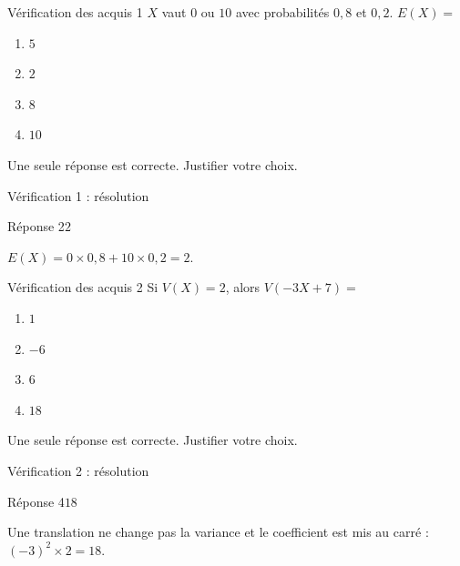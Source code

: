 \documentclass[aspectratio=169,12pt]{beamer}
\begin{document}
\renewcommand{\slidekind}{À VOUS DE JOUER}\begin{frame}[t]{Vérification des acquis 1}
$X$ vaut $0$ ou $10$ avec probabilités $0,8$ et $0,2$. $E(X)=$\begin{enumerate}
\item $5$
\item $2$
\item $8$
\item $10$
\end{enumerate}\medskip Une seule réponse est correcte. Justifier votre choix.\end{frame}
\renewcommand{\slidekind}{COMPRENDRE LA RÉPONSE}\begin{frame}[t]{Vérification 1 : résolution}
\begin{block}{Réponse 2}$2$\end{block}\medskip $E(X)=0\times0,8+10\times0,2=2$.\end{frame}
\renewcommand{\slidekind}{À VOUS DE JOUER}\begin{frame}[t]{Vérification des acquis 2}
Si $V(X)=2$, alors $V(-3X+7)=$\begin{enumerate}
\item $1$
\item $-6$
\item $6$
\item $18$
\end{enumerate}\medskip Une seule réponse est correcte. Justifier votre choix.\end{frame}
\renewcommand{\slidekind}{COMPRENDRE LA RÉPONSE}\begin{frame}[t]{Vérification 2 : résolution}
\begin{block}{Réponse 4}$18$\end{block}\medskip Une translation ne change pas la variance et le coefficient est mis au carré : $(-3)^2\times2=18$.\end{frame}
\end{document}
